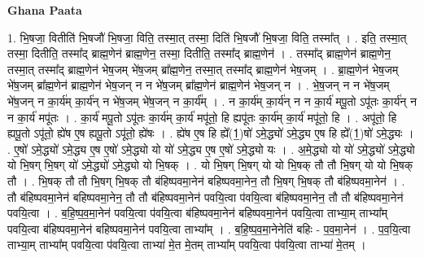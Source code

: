 \documentclass[17pt]{extarticle}
\begin{document}
\textbf{Ghana Paata } \newline

1. भि॒षजा॒ वितीति॑ भि॒षजौ॑ भि॒षजा॒ विति॒ तस्मा॒त् तस्मा॒ दिति॑ भि॒षजौ॑ भि॒षजा॒ विति॒ तस्मा᳚त् । . इति॒ तस्मा॒त् तस्मा॒ दितीति॒ तस्मा᳚द् ब्राह्म॒णेन॑ ब्राह्म॒णेन॒ तस्मा॒ दितीति॒ तस्मा᳚द् ब्राह्म॒णेन॑ । . तस्मा᳚द् ब्राह्म॒णेन॑ ब्राह्म॒णेन॒ तस्मा॒त् तस्मा᳚द् ब्राह्म॒णेन॑ भेष॒जम् भे॑ष॒जम् ब्रा᳚ह्म॒णेन॒ तस्मा॒त् तस्मा᳚द् ब्राह्म॒णेन॑ भेष॒जम् । . ब्रा॒ह्म॒णेन॑ भेष॒जम् भे॑ष॒जम् ब्रा᳚ह्म॒णेन॑ ब्राह्म॒णेन॑ भेष॒जन् न न भे॑ष॒जम् ब्रा᳚ह्म॒णेन॑ ब्राह्म॒णेन॑ भेष॒जन् न । . भे॒ष॒जन् न न भे॑ष॒जम् भे॑ष॒जन् न का॒र्य॑म् का॒र्य॑न् न भे॑ष॒जम् भे॑ष॒जन् न का॒र्य᳚म् । . न का॒र्य॑म् का॒र्य॑न् न न का॒र्य॑ मपू॒तो ऽपू॑तः का॒र्य॑न् न न का॒र्य॑ मपू॑तः । . का॒र्य॑ मपू॒तो ऽपू॑तः का॒र्य॑म् का॒र्य॑ मपू॑तो॒ हि ह्यपू॑तः का॒र्य॑म् का॒र्य॑ मपू॑तो॒ हि । . अपू॑तो॒ हि ह्यपू॒तो ऽपू॑तो॒ ह्ये॑ष ए॒ष ह्यपू॒तो ऽपू॑तो॒ ह्ये॑षः । . ह्ये॑ष ए॒ष हि ह्ये᳚(1॒)षो॑ ऽमे॒द्ध्यो॑ ऽमे॒द्ध्य ए॒ष हि ह्ये᳚(1॒)षो॑ ऽमे॒द्ध्यः । . ए॒षो॑ ऽमे॒द्ध्यो॑ ऽमे॒द्ध्य ए॒ष ए॒षो॑ ऽमे॒द्ध्यो यो यो॑ ऽमे॒द्ध्य ए॒ष ए॒षो॑ ऽमे॒द्ध्यो यः । . अ॒मे॒द्ध्यो यो यो॑ ऽमे॒द्ध्यो॑ ऽमे॒द्ध्यो यो भि॒षग् भि॒षग् यो॑ ऽमे॒द्ध्यो॑ ऽमे॒द्ध्यो यो भि॒षक् । . यो भि॒षग् भि॒षग् यो यो भि॒षक् तौ तौ भि॒षग् यो यो भि॒षक् तौ । . भि॒षक् तौ तौ भि॒षग् भि॒षक् तौ ब॑हिष्पवमा॒नेन॑ बहिष्पवमा॒नेन॒ तौ भि॒षग् भि॒षक् तौ ब॑हिष्पवमा॒नेन॑ । . तौ ब॑हिष्पवमा॒नेन॑ बहिष्पवमा॒नेन॒ तौ तौ ब॑हिष्पवमा॒नेन॑ पवयि॒त्वा प॑वयि॒त्वा ब॑हिष्पवमा॒नेन॒ तौ तौ ब॑हिष्पवमा॒नेन॑ पवयि॒त्वा । . ब॒हि॒ष्प॒व॒मा॒नेन॑ पवयि॒त्वा प॑वयि॒त्वा ब॑हिष्पवमा॒नेन॑ बहिष्पवमा॒नेन॑ पवयि॒त्वा ताभ्या॒म् ताभ्या᳚म् पवयि॒त्वा ब॑हिष्पवमा॒नेन॑ बहिष्पवमा॒नेन॑ पवयि॒त्वा ताभ्या᳚म् । . ब॒हि॒ष्प॒व॒मा॒नेनेति॑ बहिः - प॒व॒मा॒नेन॑ । . प॒व॒यि॒त्वा ताभ्या॒म् ताभ्या᳚म् पवयि॒त्वा प॑वयि॒त्वा ताभ्या॑ मे॒त मे॒तम् ताभ्या᳚म् पवयि॒त्वा प॑वयि॒त्वा ताभ्या॑ मे॒तम् । \newline
\end{document}
